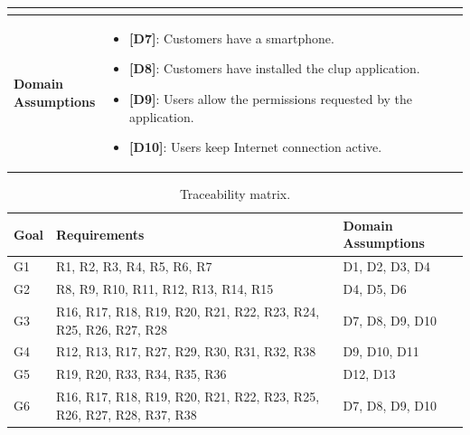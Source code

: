 \begin{table}[H]
\begin{tabular}{| m{} | m{} |}
\begin{itemize}
        \end{itemize} \\
        \hline
        \shortstack[l]{\textbf{Domain} \\ \textbf{Assumptions}} &
        \begin{itemize}
            \item {\textbf{[D7]}}: Customers have a smartphone.
            \item {\textbf{[D8]}}: Customers have installed the \gls{clup} application.
            \item {\textbf{[D9]}}: Users allow the permissions requested by the application.
            \item {\textbf{[D10]}}: Users keep Internet connection active.
        \end{itemize} \\
        \hline
    \end{tabular}
\end{table}

\begin{table}[H]
    \centering
    \begin{tabular}{| m{} | m{} | m{} |}
        \hline
        \textbf{Goal} & \textbf{Requirements}                                                & \textbf{Domain Assumptions} \\
        \hline
        G1              & R1, R2, R3, R4, R5, R6, R7                                           & D1, D2, D3, D4              \\
        \hline
        G2              & R8, R9, R10, R11, R12, R13, R14, R15                                 & D4, D5, D6                  \\
        \hline
        G3              & R16, R17, R18, R19, R20, R21, R22, R23, R24, R25, R26, R27, R28      & D7, D8, D9, D10             \\
        \hline
        G4              & R12, R13, R17, R27, R29, R30, R31, R32, R38                          & D9, D10, D11                \\
        \hline
        G5              & R19, R20, R33, R34, R35, R36                                         & D12, D13                    \\
        \hline
        G6              & R16, R17, R18, R19, R20, R21, R22, R23, R25, R26, R27, R28, R37, R38 & D7, D8, D9, D10             \\
        \hline
    \end{tabular}
    \caption{Traceability matrix.}
\end{table}

